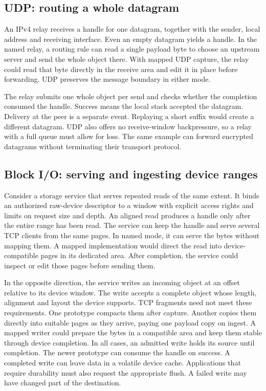 \subsection{UDP: routing a whole datagram}
\label{sec:named:udp}

An IPv4 relay receives a handle for one datagram, together with the sender,
local address and receiving interface. Even an empty datagram yields a handle.
In the named relay, a routing rule can read a single payload byte to choose an
upstream server and send the whole object there. With mapped UDP capture, the
relay could read that byte directly in the receive area and edit it in place
before forwarding. UDP preserves the message boundary in either mode.

The relay submits one whole object per send and checks whether the completion
consumed the handle. Success means the local stack accepted the datagram.
Delivery at the peer is a separate event. Replaying a short suffix would create
a different datagram. UDP also offers no receive-window backpressure, so a
relay with a full queue must allow for loss. The same example can forward
encrypted datagrams without terminating their transport protocol.

\subsection{Block I/O: serving and ingesting device ranges}
\label{sec:named:block}

Consider a storage service that serves repeated reads of the same extent. It
binds an authorized raw-device descriptor to a window with explicit access rights
and limits on request size and depth. An aligned read produces a handle only
after the entire range has been read. The service can keep the handle and serve
several TCP clients from the same pages. In named mode, it can serve the bytes
without mapping them. A mapped implementation would direct the read into
device-compatible pages in its dedicated area. After completion, the service
could inspect or edit those pages before sending them.

In the opposite direction, the service writes an incoming object at an offset
relative to its device window. The write accepts a complete object whose
length, alignment and layout the device supports. TCP fragments need not meet
these requirements. One prototype compacts them after capture. Another copies
them directly into suitable pages as they arrive, paying one payload copy on
ingest. A mapped writer could prepare the bytes in a compatible area and keep
them stable through device completion. In all cases, an admitted write holds
its source until completion. The newer prototype can consume the handle on
success. A completed write can leave data in a volatile device cache.
Applications that require durability must also request the appropriate flush.
A failed write may have changed part of the destination.
